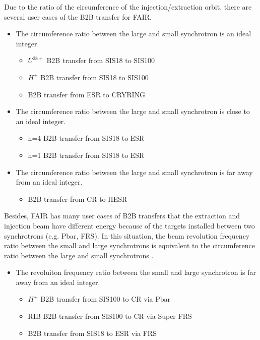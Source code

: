Due to the ratio of the circumference of the injection/extraction orbit, there are several user cases of the B2B transfer for FAIR. 
\begin{itemize}
	\item The circumference ratio between the large and small synchrotron is an ideal integer.
		\begin{itemize}
			\item	$U^{28+}$ B2B transfer from SIS18 to SIS100
			\item $H^{+}$ B2B transfer from SIS18 to SIS100
			\item B2B transfer from ESR to CRYRING
		\end{itemize}
	\item The circumference ratio between the large and small synchrotron is close to an ideal integer.
		\begin{itemize}
			\item h=4 B2B transfer from SIS18 to ESR
			\item h=1 B2B transfer from SIS18 to ESR
		\end{itemize}
 	\item The circumference ratio between the large and small synchrotron is far away from an ideal integer.
		\begin{itemize}
			\item B2B transfer from CR to HESR
		\end{itemize}
\end{itemize}
Besides, FAIR has many user cases of B2B transfers that the extraction and injection beam have different energy because of the targets installed between two synchrotrons (e.g. Pbar, FRS). In this situation, the beam revolution frequency ratio between the small and large synchrotrons is equivalent to the circumference ratio between the large and small synchrotrons . 

\begin{itemize}

 	\item The revoluiton frequency ratio between the small and large synchrotron is far away from an ideal integer.
		\begin{itemize}
			\item $H^{+}$ B2B transfer from SIS100 to CR via Pbar
			\item RIB B2B transfer from SIS100 to CR via Super FRS
			\item B2B transfer from SIS18 to ESR via FRS
		\end{itemize}
\end{itemize}
  
